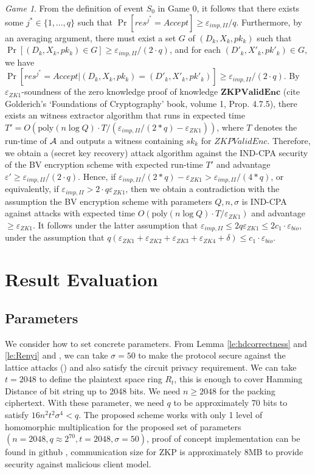 \textit{Game 1}. From the definition of event $S_0$ in Game 0, it follows that there exists some $j^* \in \{1,\ldots,q\}$ such that $\Pr[res^{j^*} = Accept] \geq \varepsilon_{imp,II}/q$. Furthermore, by an averaging argument, there must exist a set $G$ of $(D_k,X_k,pk_k)$ such that $\Pr[(D_k,X_k,pk_k) \in G] \geq \varepsilon_{imp,II}/(2 \cdot q)$, and for each $(D'_k,X'_k,pk'_k) \in G$, we have $\Pr[res^{j^*} = Accept |(D_k,X_k,pk_k)=(D'_k,X'_k,pk'_k)] \geq  \varepsilon_{imp,II}/(2 \cdot q)$. By $\varepsilon_{ZK1}$-soundness of the zero knowledge proof of knowledge $\mathbf{ZKPValidEnc}$ (cite Golderich's `Foundations of Cryptography' book, volume 1, Prop. 4.7.5), there exists an witness extractor algorithm that runs in expected time $T'=O(\mathrm{poly}(n \log Q) \cdot T / (\varepsilon_{imp,II}/(2*q) - \varepsilon_{ZK1}))$, where $T$ denotes the run-time of $\mathcal{A}$ and outputs a witness containing $sk_k$ for ${ZKPValidEnc}$. Therefore, we obtain a (secret key recovery) attack algorithm against the IND-CPA security of the BV encryption scheme with expected run-time $T'$ and advantage $\varepsilon' \geq \varepsilon_{imp,II}/(2 \cdot q)$. Hence,  if $\varepsilon_{imp,II}/(2*q) - \varepsilon_{ZK1} > \varepsilon_{imp,II}/(4*q)$, or equivalently, if $\varepsilon_{imp,II} > 2 \cdot q \varepsilon_{ZK1}$, then we obtain a contradiction with the assumption the BV encryption scheme with parameters $Q,n,\sigma$ is IND-CPA against attacks with expected time $O(\mathrm{poly}(n \log Q) \cdot T / \varepsilon_{ZK1})$ and advantage $\geq \varepsilon_{ZK1}$. It follows under the latter assumption that $\varepsilon_{imp,II} \leq 2q \varepsilon_{ZK1} \leq 2 c_1  \cdot \varepsilon_{bio}$, under the assumption that  $q(\varepsilon_{ZK1}+\varepsilon_{ZK2} +
\varepsilon_{ZK3} + \varepsilon_{ZK4} + \delta) \leq c_1 \cdot \varepsilon_{bio}$.


\section{Result Evaluation}

\subsection{Parameters}
\label{sec:parameters}
We consider how to set concrete parameters. From Lemma \ref{le:hdcorrectness} and \ref{le:Renyi} and
\cite{naehrig2011can}, we can take \(\sigma = 50\) to make the protocol secure against the lattice attacks
(\cite{micciancio2008lattice}) and
also satisfy the circuit privacy requirement. We can take \(t = 2048\) to define the plaintext space ring \(R_{t}\),
this is enough to cover Hamming Distance of bit string up to 2048 bits. We need \(n \geq 2048\) for the packing
ciphertext. With these parameter, we need \(q\) to be approximately 70 bits to satisfy \(16n^{2}t^{2}\sigma^{4} < q\).
The proposed scheme works with only 1 level of homomorphic multiplication for the proposed set of parameters
$(n = 2048, q \approx 2^{70}, t = 2048, \sigma = 50)$, proof of concept implementation can be found in github
\cite{rimrimrq38:online}, communication size for ZKP is approximately 8MB to provide security against malicious client
model.

